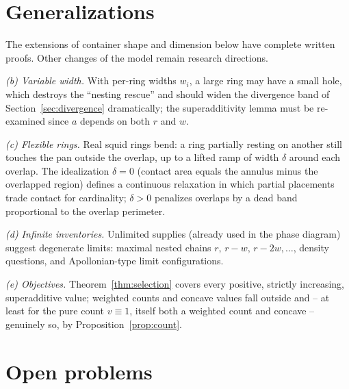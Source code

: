 \documentclass[11pt]{article}
\theoremstyle{definition}
\begin{document}
\section{Generalizations}\label{sec:general}

The extensions of container shape and dimension below have complete
written proofs. Other changes of the model remain research directions.


\emph{(b) Variable width.} With per-ring widths $w_i$, a large ring may have a
small hole, which destroys the ``nesting rescue'' and should widen the
divergence band of Section~\ref{sec:divergence} dramatically; the
superadditivity lemma must be re-examined since $a$ depends on both $r$ and
$w$.

\emph{(c) Flexible rings.} Real squid rings bend: a ring partially resting on
another still touches the pan outside the overlap, up to a lifted ramp of
width $\delta$ around each overlap. The idealization $\delta=0$ (contact area
equals the annulus minus the overlapped region) defines a continuous
relaxation in which partial placements trade contact for cardinality; $\delta>0$
penalizes overlaps by a dead band proportional to the overlap perimeter.

\emph{(d) Infinite inventories.} Unlimited supplies (already used in the
phase diagram) suggest degenerate limits: maximal nested chains
$r,\,r-w,\,r-2w,\dots$, density questions, and Apollonian-type limit
configurations.

\emph{(e) Objectives.} Theorem~\ref{thm:selection} covers every positive,
strictly increasing, superadditive value; weighted counts and concave values
fall outside and -- at least for the pure count $v\equiv1$, itself both a
weighted count and concave -- genuinely so, by
Proposition~\ref{prop:count}.

\section{Open problems}\label{sec:open}
\end{document}
